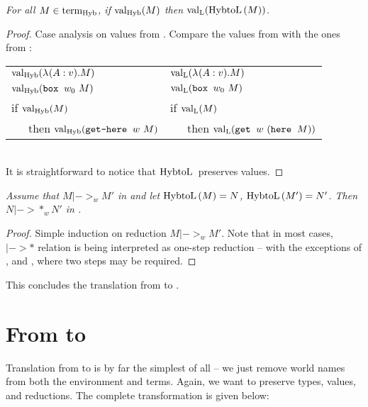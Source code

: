 \begin{theorem} \em
For all $M \in \teHyb{}$, if $\val[\tHyb]{M}$ then $\val[\tL]{\funHybtoL{M}}$.
\begin{proof}
Case analysis on values from \langHyb{}. Compare the values from \langHyb{} with the ones from \langL{}:\\

\begin{tabular}{ l l }
$\val[\tHyb]{\lam A v M}$ &
$\val[\tL]{\lam A v M}$\\
$\val[\tHyb]{\bbox {w_0} M}$ &
$\val[\tL]{\bbox {w_0} M}$\\
if ${\val [\tHyb] M}$ &
if ${\val [\tL] M}$ \\
~~~then ${\val [\tHyb] {\gethere w M}}$ &
~~~then ${\val [\tL] {\get w (\here M)}}$
\end{tabular}\\

It is straightforward to notice that $\funHybtoLe{}$ preserves values.
\end{proof}
\end{theorem}


\begin{theorem}\em
Assume that $M |->_w M'$ in \langHyb{} and let $\funHybtoL{M} = N$, $\funHybtoL{M'} = N'$. Then $N |->*_w N'$ in \langL{}.
\begin{proof}
Simple induction on reduction $M|->_w M'$. Note that in most cases, $|->*$ relation is being interpreted as one-step reduction -- with the exceptions of \unboxfetche{}, \getheree{} and , where two steps may be required.
\end{proof}
\end{theorem}

This concludes the translation from \langHyb{} to \langL{}.



\section{From \langHyb{} to \langLF{}}

Translation from \langHyb{} to \langLF{} is by far the simplest of all -- we just remove world names from both the environment and terms. Again, we want to preserve types, values, and reductions. The complete transformation is given below:

